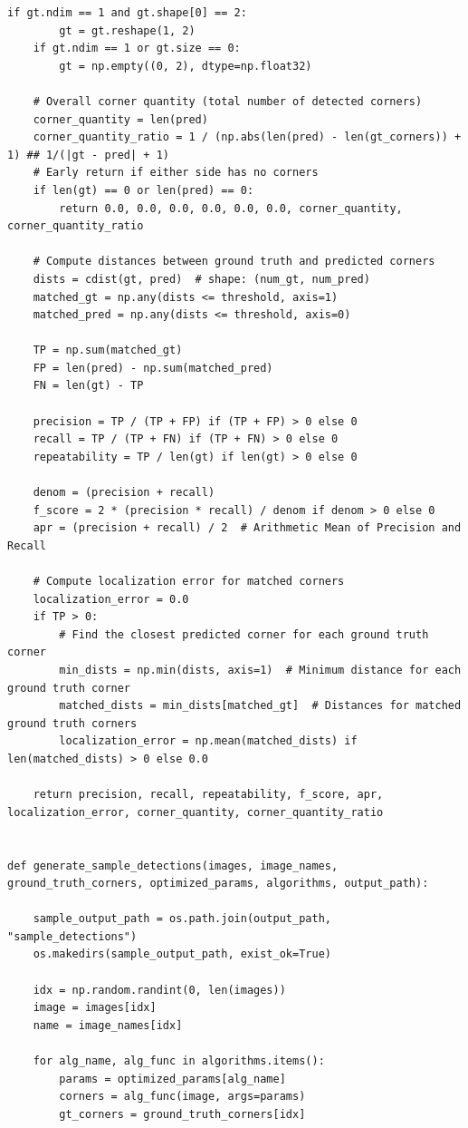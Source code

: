 \documentclass[journal]{IEEEtran}
\begin{document}
\begin{lstlisting}[style=python, caption={Utility Functions for Data Processing}, label={lst:utilities}]
    if gt.ndim == 1 and gt.shape[0] == 2:
        gt = gt.reshape(1, 2)
    if gt.ndim == 1 or gt.size == 0:
        gt = np.empty((0, 2), dtype=np.float32)

    # Overall corner quantity (total number of detected corners)
    corner_quantity = len(pred)
    corner_quantity_ratio = 1 / (np.abs(len(pred) - len(gt_corners)) + 1) ## 1/(|gt - pred| + 1)
    # Early return if either side has no corners
    if len(gt) == 0 or len(pred) == 0:
        return 0.0, 0.0, 0.0, 0.0, 0.0, 0.0, corner_quantity, corner_quantity_ratio

    # Compute distances between ground truth and predicted corners
    dists = cdist(gt, pred)  # shape: (num_gt, num_pred)
    matched_gt = np.any(dists <= threshold, axis=1)
    matched_pred = np.any(dists <= threshold, axis=0)

    TP = np.sum(matched_gt)
    FP = len(pred) - np.sum(matched_pred)
    FN = len(gt) - TP

    precision = TP / (TP + FP) if (TP + FP) > 0 else 0
    recall = TP / (TP + FN) if (TP + FN) > 0 else 0
    repeatability = TP / len(gt) if len(gt) > 0 else 0

    denom = (precision + recall)
    f_score = 2 * (precision * recall) / denom if denom > 0 else 0
    apr = (precision + recall) / 2  # Arithmetic Mean of Precision and Recall

    # Compute localization error for matched corners
    localization_error = 0.0
    if TP > 0:
        # Find the closest predicted corner for each ground truth corner
        min_dists = np.min(dists, axis=1)  # Minimum distance for each ground truth corner
        matched_dists = min_dists[matched_gt]  # Distances for matched ground truth corners
        localization_error = np.mean(matched_dists) if len(matched_dists) > 0 else 0.0

    return precision, recall, repeatability, f_score, apr, localization_error, corner_quantity, corner_quantity_ratio

        
def generate_sample_detections(images, image_names, ground_truth_corners, optimized_params, algorithms, output_path):

    sample_output_path = os.path.join(output_path, "sample_detections")
    os.makedirs(sample_output_path, exist_ok=True)
    
    idx = np.random.randint(0, len(images))
    image = images[idx]
    name = image_names[idx]
    
    for alg_name, alg_func in algorithms.items():
        params = optimized_params[alg_name]
        corners = alg_func(image, args=params)
        gt_corners = ground_truth_corners[idx]
        

\end{lstlisting}
\end{document}
